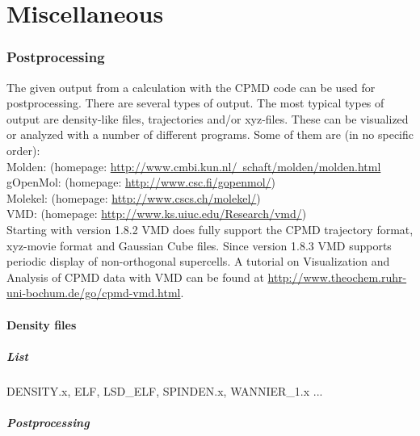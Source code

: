 \documentclass[twoside,10pt,titlepage,a4paper]{article}
\newcommand{\htref}[2]{\href{#1}{#2}}
\newcommand{\htref}[2]{\htmladdnormallink{#2}{#1}}
\begin{document}
\part{Miscellaneous}
\section{Postprocessing}\label{post}

  The given output from a calculation with the CPMD code can be used for
postprocessing. There are several types of output. The most typical types of
output are density-like files, trajectories and/or xyz-files. These can
be visualized or analyzed with a number of different programs. Some of them
are (in no specific order):\\
Molden: (homepage: 
\htref{http://www.cmbi.kun.nl/~schaft/molden/molden.html}{http://www.cmbi.kun.nl/~schaft/molden/molden.html}\\
gOpenMol: (homepage: \htref{http://www.csc.fi/gopenmol/}{http://www.csc.fi/gopenmol/})\\
Molekel: (homepage: \htref{http://www.cscs.ch/molekel/}{http://www.cscs.ch/molekel/})\\
VMD: (homepage:
\htref{http://www.ks.uiuc.edu/Research/vmd/}{http://www.ks.uiuc.edu/Research/vmd/})\\
Starting with version 1.8.2 VMD does fully support the CPMD trajectory format,
xyz-movie format and Gaussian Cube files. Since version 1.8.3 VMD
supports periodic display of non-orthogonal supercells.
A tutorial on Visualization and Analysis of CPMD data with VMD can be
found at
\htref{http://www.theochem.ruhr-uni-bochum.de/go/cpmd-vmd.html}{http://www.theochem.ruhr-uni-bochum.de/go/cpmd-vmd.html}.



\subsection{Density files}

\subsubsection{List}

DENSITY.x, ELF, LSD\_ELF, SPINDEN.x, WANNIER\_1.x ...

\subsubsection{Postprocessing}
\end{document}
